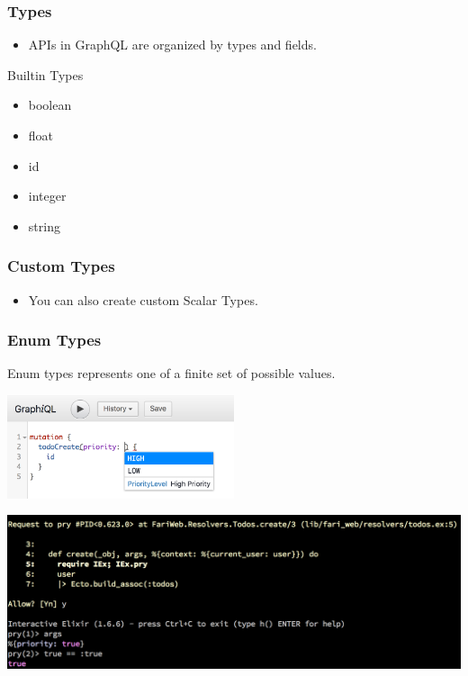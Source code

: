 \documentclass{beamer}
\begin{document}
\begin{frame}
  \frametitle{Types}

  \begin{itemize}
    \item{APIs in GraphQL are organized by types and fields.}
  \end{itemize}
  \begin{block}{Builtin Types}
    \begin{itemize}
    \item{boolean}
    \item{float}
    \item{id}
    \item{integer}
    \item{string}
    \end{itemize}
  \end{block}
\end{frame}

\begin{frame}
  \frametitle{Custom Types}

  \begin{itemize}
    \item{You can also create custom Scalar Types.}
  \end{itemize}

  \CustomScalarType
\end{frame}

\begin{frame}
  \frametitle{Enum Types}
  Enum types represents one of a finite set of possible values.
  \EnumType
  
  \centering
  \includegraphics[width=0.5\textwidth]{graphiql-enum}
\end{frame}

\begin{frame}
  \includegraphics[width=1.0\textwidth]{enum_example}
\end{frame}
\end{document}

